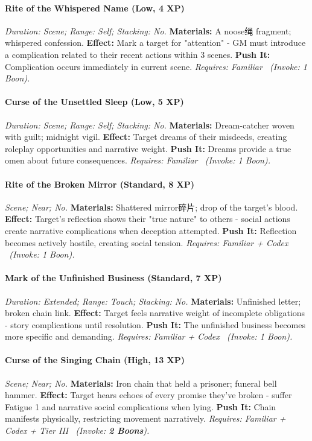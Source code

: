 \documentclass[12pt,twoside]{book}
\begin{document}
\paragraph{Rite of the Whispered Name (Low, 4 XP)} \emph{Duration: Scene; Range: Self; Stacking: No.}
\textbf{Materials:} A noose绳 fragment; whispered confession.
\textbf{Effect:} Mark a target for "attention" - GM must introduce a complication related to their recent actions within 3 scenes.
\textbf{Push It:} Complication occurs immediately in current scene.
\emph{Requires: Familiar \ (\textit{Invoke:} 1 Boon).}
\paragraph{Curse of the Unsettled Sleep (Low, 5 XP)} \emph{Duration: Scene; Range: Self; Stacking: No.}
\textbf{Materials:} Dream-catcher woven with guilt; midnight vigil.
\textbf{Effect:} Target dreams of their misdeeds, creating roleplay opportunities and narrative weight.
\textbf{Push It:} Dreams provide a true omen about future consequences.
\emph{Requires: Familiar \ (\textit{Invoke:} 1 Boon).}
\paragraph{Rite of the Broken Mirror (Standard, 8 XP)} \emph{Scene; Near; No.}
\textbf{Materials:} Shattered mirror碎片; drop of the target's blood.
\textbf{Effect:} Target's reflection shows their "true nature" to others - social actions create narrative complications when deception attempted.
\textbf{Push It:} Reflection becomes actively hostile, creating social tension.
\emph{Requires: Familiar + Codex \ (\textit{Invoke:} 1 Boon).}
\paragraph{Mark of the Unfinished Business (Standard, 7 XP)} \emph{Duration: Extended; Range: Touch; Stacking: No.}
\textbf{Materials:} Unfinished letter; broken chain link.
\textbf{Effect:} Target feels narrative weight of incomplete obligations - story complications until resolution.
\textbf{Push It:} The unfinished business becomes more specific and demanding.
\emph{Requires: Familiar + Codex \ (\textit{Invoke:} 1 Boon).}
\paragraph{Curse of the Singing Chain (High, 13 XP)} \emph{Scene; Near; No.}
\textbf{Materials:} Iron chain that held a prisoner; funeral bell hammer.
\textbf{Effect:} Target hears echoes of every promise they've broken - suffer Fatigue 1 and narrative social complications when lying.
\textbf{Push It:} Chain manifests physically, restricting movement narratively.
\emph{Requires: Familiar + Codex + Tier III \ (\textit{Invoke:} \textbf{2 Boons}).}
\end{document}
